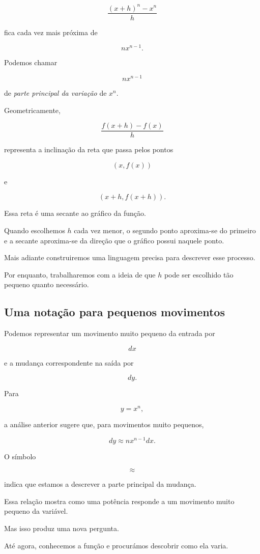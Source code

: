 \documentclass[12pt,a4paper]{article}
\begin{document}
\[
\frac{(x+h)^n-x^n}{h}
\]

fica cada vez mais próxima de

\[
nx^{n-1}.
\]

Podemos chamar

\[
nx^{n-1}
\]

de \emph{parte principal da variação} de \(x^n\).

Geometricamente,

\[
\frac{f(x+h)-f(x)}{h}
\]

representa a inclinação da reta que passa pelos pontos

\[
(x,f(x))
\]

e

\[
(x+h,f(x+h)).
\]

Essa reta é uma secante ao gráfico da função.

Quando escolhemos \(h\) cada vez menor, o segundo ponto aproxima-se do
primeiro e a secante aproxima-se da direção que o gráfico possui naquele
ponto.

Mais adiante construiremos uma linguagem precisa para descrever esse
processo.

Por enquanto, trabalharemos com a ideia de que \(h\) pode ser escolhido
tão pequeno quanto necessário.

\subsection{Uma notação para pequenos movimentos}

Podemos representar um movimento muito pequeno da entrada por

\[
dx
\]

e a mudança correspondente na saída por

\[
dy.
\]

Para

\[
y=x^n,
\]

a análise anterior sugere que, para movimentos muito pequenos,

\[
dy
\approx
nx^{n-1}dx.
\]

O símbolo

\[
\approx
\]

indica que estamos a descrever a parte principal da mudança.

Essa relação mostra como uma potência responde a um movimento muito
pequeno da variável.

Mas isso produz uma nova pergunta.

Até agora, conhecemos a função e procurámos descobrir como ela varia.
\end{document}

